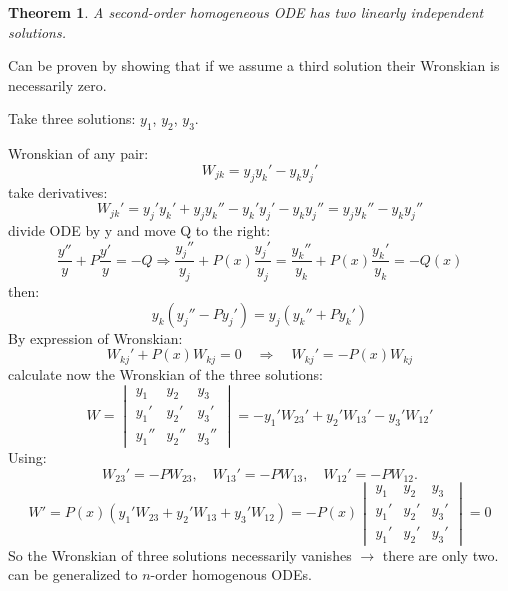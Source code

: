 \documentclass{article}
\newtheorem{theorem}{Theorem}
\begin{document}
\begin{theorem}
    A second-order homogeneous ODE has two linearly independent solutions.
\end{theorem}

\noindent
Can be proven by showing that if we assume a third solution their Wronskian is necessarily zero.

\noindent
Take three solutions: $y_1$, $y_2$, $y_3$.

\noindent
Wronskian of any pair: 
\begin{equation}
    W_{jk} = y_j y_k' - y_k y_j'
\end{equation}
take derivatives:
\begin{equation}
    W_{jk}' = y_j' y_k' + y_j y_k'' - y_k' y_j' - y_k y_j'' =  y_j y_k'' - y_k y_j''
\end{equation}
divide ODE by y and move Q to the right:
\begin{equation}
    \frac{y''}{y} + P \frac{y'}{y} = -Q 
\Rightarrow 
\frac{y_j''}{y_j} + P(x) \frac{y_j'}{y_j} = \frac{y_k''}{y_k} + P(x) \frac{y_k'}{y_k} = -Q(x)
\end{equation}
then:
\begin{equation}
    y_k \left( y_j'' - P y_j' \right) = y_j \left( y_k'' + P y_k' \right)
\end{equation}
\newpage
\noindent
By expression of Wronskian:
\begin{equation}
    W_{kj}' + P(x) W_{kj} = 0 \quad \Rightarrow \quad W_{kj}' = -P(x) W_{kj}
\end{equation}
calculate now the Wronskian of the three solutions:
\begin{equation}
W = 
\begin{vmatrix}
y_1 & y_2 & y_3 \\
y_1' & y_2' & y_3' \\
y_1'' & y_2'' & y_3''
\end{vmatrix}
= -y_1' W_{23}' + y_2' W_{13}' - y_3' W_{12}'
\end{equation}
Using:
\begin{equation}
    W_{23}' = -P W_{23}, \quad W_{13}' = -P W_{13}, \quad W_{12}' = -P W_{12}.
\end{equation}
\begin{equation}
    W' = P(x) \left( y_1' W_{23} + y_2' W_{13} + y_3' W_{12} \right)
= -P(x)
\begin{vmatrix}
y_1 & y_2 & y_3 \\
y_1' & y_2' & y_3' \\
y_1' & y_2' & y_3'
\end{vmatrix}
= 0
\end{equation}
So the Wronskian of three solutions necessarily vanishes $\rightarrow$ there are only two. \color{red}can be generalized to $n$-order homogenous ODEs. \color{black}
\end{document}
